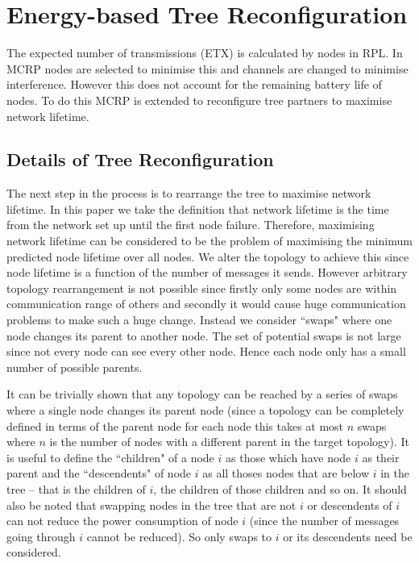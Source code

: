 \section{Energy-based Tree Reconfiguration}
\label{OptimalTree}

The expected number of transmissions (ETX) is calculated by nodes in RPL.  In MCRP nodes are selected to minimise this and channels are changed to minimise interference. However this does not account for the remaining battery life of nodes.  To do this MCRP is extended to reconfigure tree partners to maximise network lifetime.  

\subsection{Details of Tree Reconfiguration}

The next step in the process is to rearrange the tree to maximise network lifetime.  In this paper we take the definition that network lifetime is the time from the network set up until the first node failure.  Therefore, maximising network lifetime can be considered to be the problem of maximising the minimum predicted node lifetime over all nodes.  We alter the topology to achieve this since node lifetime is a function of the number of messages it sends.  However arbitrary topology rearrangement is not possible since firstly only some nodes are within communication range of others and secondly it would cause huge communication problems to make such a huge change.  Instead we consider ``swaps" where one node changes its parent to another node. The set of potential swaps is not large since not every node can see every other node.  Hence each node only has a small number of possible parents.  

It can be trivially shown that any topology can be reached by a series of swaps where a single node changes its parent node (since a topology can be completely defined in terms of the parent node for each node this takes at most $n$ swaps where $n$ is the number of nodes with a different parent in the target topology).  It is useful to define the ``children" of a node $i$ as those which have node $i$ as their parent and the ``descendents" of node $i$ as all thoses nodes that are below $i$ in the tree -- that is the children of $i$, the children of those children and so on.  It should also be noted that swapping nodes in the tree that are not $i$ or descendents of $i$ can not reduce the power consumption of node $i$ (since the number of messages going through $i$ cannot be reduced).  So only swaps to $i$ or its descendents need be considered.

